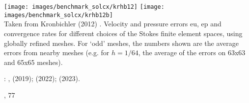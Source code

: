 \begin{center}
\texttt{[image: images/benchmark\_solcx/krhb12]}
\texttt{[image: images/benchmark\_solcx/krhb12b]}\\
{\captionfont Taken from Kronbichler \etal (2012) \cite{krhb12}.
Velocity and pressure errors eu, ep and convergence rates for different choices of 
the Stokes finite element spaces, using globally refined meshes. 
For `odd' meshes, the numbers shown are the average errors from nearby meshes 
(e.g. for $h=1/64$, the average of the errors on 63x63 and 65x65 meshes).}
\end{center}


\Literature: \cite{mamo08,vemmXX},
\textcite{demh19} (2019);
\textcite{mivg22} (2022); 
\textcite{sedu23} (2023).

, 77



